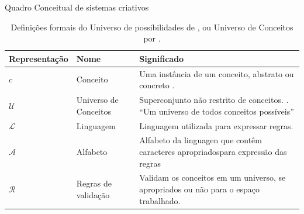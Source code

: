 \documentclass[aspectratio=169]{beamer}
\begin{document}
\begin{frame}{Quadro Conceitual de sistemas criativos}
\begin{table}[!h]
\caption{Definições formais do Universo de possibilidades de , ou Universo de Conceitos por .}
\small
    \begin{tabular}{ | p{3.25cm} | p{4.25cm} | p{4.25cm} |}
    \hline 
    \hline 

    Representação
    & \tiny{Nome}     
    & \tiny{Significado} \\
    \hline

    $c$
    & \tiny{Conceito} 
    & \tiny{Uma instância de um conceito, abstrato ou concreto \cite{wiggins_framework_2006}}. \\
    \hline

    $\mathcal{U}$
    & \tiny{Universo de Conceitos} 
    & \tiny{Superconjunto não restrito de conceitos. \cite{wiggins_framework_2006}. ``Um universo de todos conceitos possíveis'' \cite{mclean_music_2006} }\\
    \hline

    $\mathcal{L}$
    & \tiny{Linguagem} 
    & \tiny{Linguagem utilizada para expressar regras.} \\
    \hline

    $\mathcal{A}$
    & \tiny{Alfabeto} 
    & \tiny{Alfabeto da linguagen que contêm caracteres apropriadospara expressão das regras} \\
    \hline

    $\mathcal{R}$
    & \tiny{Regras de validação} 
    & \tiny{Validam os conceitos em um universo, se apropriados ou não para o espaço trabalhado.} \\
    \hline
    \hline
   
    \end{tabular}
\label{tab:universodeconceitos}
\end{table}
\end{frame}
\end{document}
